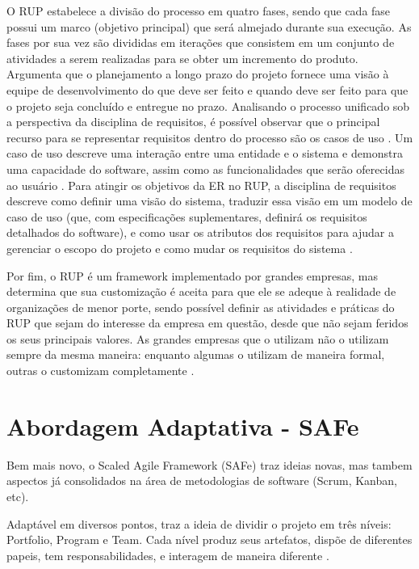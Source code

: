 O RUP estabelece a divisão do processo em quatro fases, sendo que cada fase possui um marco (objetivo principal) que será almejado durante sua execução. As fases por sua vez são divididas em iterações que consistem em um conjunto de atividades a serem realizadas para se obter um incremento do produto. Argumenta que o planejamento a longo prazo do projeto fornece uma visão à equipe de desenvolvimento do que deve ser feito e quando deve ser feito para que o projeto seja concluído e entregue no prazo. Analisando o processo unificado sob a perspectiva da disciplina de requisitos, é possível observar que o principal recurso para se representar requisitos dentro do processo são os casos de uso \cite{kruchten001}. Um caso de uso descreve uma interação entre uma entidade e o sistema e demonstra uma capacidade do software, assim como as funcionalidades que serão oferecidas ao usuário \cite{kruchten003}. Para atingir os objetivos da ER no RUP, a disciplina de requisitos descreve como definir uma visão do sistema, traduzir essa visão em um modelo de caso de uso (que, com especificações suplementares, definirá os requisitos detalhados do software), e como usar os atributos dos requisitos para ajudar a gerenciar o escopo do projeto e como mudar os requisitos do sistema \cite{kruchten004}.


Por fim, o RUP é um framework implementado por grandes empresas, mas determina que sua customização é aceita para que ele se adeque à realidade de organizações de menor porte, sendo possível definir as atividades e práticas do RUP que sejam do interesse da empresa em questão, desde que não sejam feridos os seus principais valores. As grandes empresas que o utilizam não o utilizam sempre da mesma maneira: enquanto algumas o utilizam de maneira formal, outras o customizam completamente \cite{kruchten005}.

\section{Abordagem Adaptativa - SAFe}
Bem mais novo, o Scaled Agile Framework (SAFe) traz ideias novas, mas tambem aspectos já consolidados na área de metodologias de software (Scrum, Kanban, etc).

Adaptável em diversos pontos, traz a ideia de dividir o projeto em três níveis: Portfolio, Program e Team. Cada nível produz seus artefatos, dispõe de diferentes papeis, tem responsabilidades, e interagem de maneira diferente \cite{safe003}.

